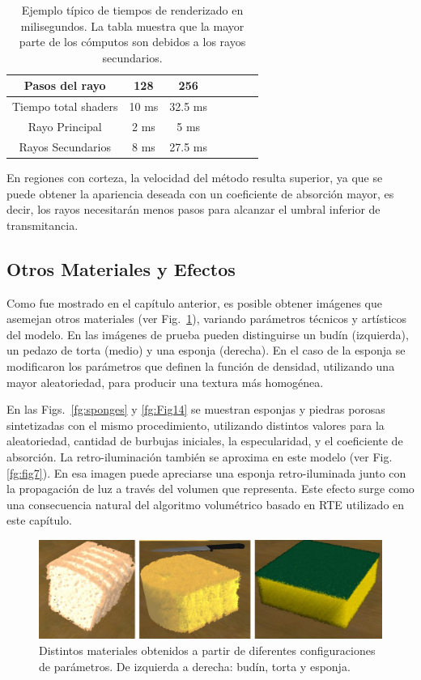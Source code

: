 \begin{table}[htb]
\centering
\begin{tabular}{|c|c|c|c|c|c|c|}
\hline
 Pasos del rayo         & 128 &  256 \\
\hline
\hline
 Tiempo total shaders   & 10 ms &  32.5 ms \\
\hline
 Rayo Principal         & 2 ms  & 5 ms  \\
\hline
 Rayos Secundarios      &  8 ms & 27.5 ms  \\
\hline
\end{tabular}
\caption[Tiempos de renderizado en milisegundos]{Ejemplo típico de tiempos de renderizado en milisegundos. La tabla muestra que la mayor parte de los cómputos son debidos a los rayos secundarios.}
\label{tab:rayossecundarios}
\end{table}


En regiones con corteza, la velocidad del método resulta superior, ya que se puede obtener la apariencia deseada con un coeficiente de absorción mayor, es decir, los rayos necesitarán menos pasos para alcanzar el umbral inferior de transmitancia.

\subsection{Otros Materiales y Efectos}
Como fue mostrado en el capítulo anterior, es posible obtener imágenes que asemejan otros materiales (ver Fig.~\ref{fg:fig6}), variando parámetros técnicos y artísticos del modelo.
En las imágenes de prueba pueden distinguirse un budín (izquierda), un pedazo de torta (medio) y una esponja (derecha).
En el caso de la esponja se modificaron los parámetros que definen la función de densidad, utilizando una mayor aleatoriedad, para producir una textura más homogénea.

En las Figs.~\ref{fg:sponges} y \ref{fg:Fig14} se muestran esponjas y piedras porosas sintetizadas con el mismo procedimiento, utilizando distintos valores para la aleatoriedad, cantidad de burbujas iniciales, la especularidad, y el coeficiente de absorción.
La retro-iluminación también se aproxima en este modelo (ver Fig. \ref{fg:fig7}).
En esa imagen puede apreciarse una esponja retro-iluminada junto con la propagación de luz a través del volumen que representa.
Este efecto surge como una consecuencia natural del algoritmo volumétrico basado en RTE utilizado en este capítulo.

\begin{figure}[htb!]
  \centerline{\includegraphics[width=12cm]{figures/fig6}}
  \caption[Budín, torta y esponja renderizados]{Distintos materiales obtenidos a partir de diferentes configuraciones de parámetros. De izquierda a derecha: budín, torta y esponja. }
  \label{fg:fig6}

\end{figure}

